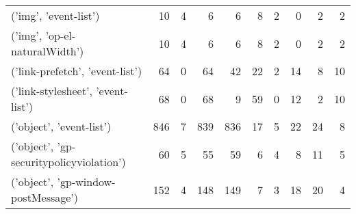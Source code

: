 \begin{tabular}{lrrrrrrrrr}
                       ('img', 'event-list') &                               10 &                                  4 &                                      6 &                            6 &                           8 &                                   2 &                                      0 &                             2 &                            2 \\
               ('img', 'op-el-naturalWidth') &                               10 &                                  4 &                                      6 &                            6 &                           8 &                                   2 &                                      0 &                             2 &                            2 \\
             ('link-prefetch', 'event-list') &                               64 &                                  0 &                                     64 &                           42 &                          22 &                                   2 &                                     14 &                             8 &                           10 \\
           ('link-stylesheet', 'event-list') &                               68 &                                  0 &                                     68 &                            9 &                          59 &                                   0 &                                     12 &                             2 &                           10 \\
                    ('object', 'event-list') &                              846 &                                  7 &                                    839 &                          836 &                          17 &                                   5 &                                     22 &                            24 &                            8 \\
    ('object', 'gp-securitypolicyviolation') &                               60 &                                  5 &                                     55 &                           59 &                           6 &                                   4 &                                      8 &                            11 &                            5 \\
         ('object', 'gp-window-postMessage') &                              152 &                                  4 &                                    148 &                          149 &                           7 &                                   3 &                                     18 &                            20 &                            4 \\

\end{tabular}

